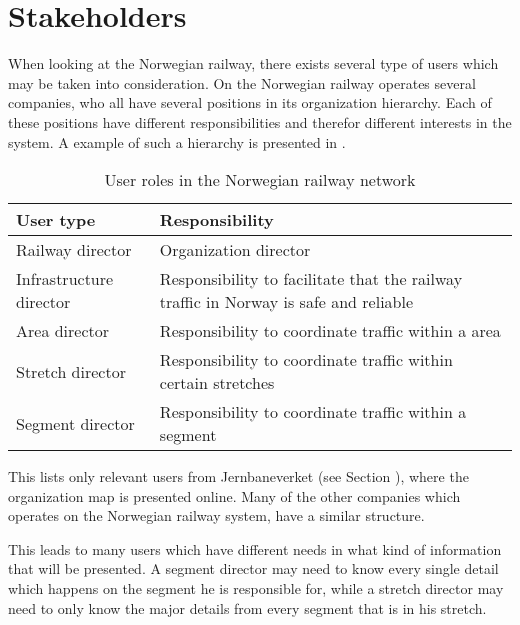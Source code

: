 \clearpage
\section{Stakeholders} %
\label{sec:back_stakeholders}
When looking at the Norwegian railway, there exists several type of users which
may be taken into consideration. On the Norwegian railway operates several
companies, who all have several positions in its organization hierarchy. Each
of these positions have different responsibilities and therefor different
interests in the system. A example of such a hierarchy is presented in
.

\begin{table}[!h]\small
	\begin{tabularx}{\textwidth}{|l|X|}
		\hline
		User type & Responsibility \\
		\hline
		Railway director & Organization director\\
		\hline
		Infrastructure director & Responsibility to facilitate that the railway traffic in Norway is safe and reliable\\
		\hline
		Area director & Responsibility to coordinate traffic within a area\\
		\hline
		Stretch director & Responsibility to coordinate traffic within certain
		stretches\\
		\hline
		Segment director & Responsibility to coordinate traffic within a segment\\
		\hline
	\end{tabularx}
\caption{User roles in the Norwegian railway network}
\label{table:user_roles}
\end{table}

This lists only relevant users from Jernbaneverket (see Section
), where the organization map is presented
online\cite{jernbaneverketOrganisasjon}\cite{jernbaneverketInfrastruktdivisjon}.
Many of the other companies which operates on the Norwegian railway system,
have a similar structure. 

This leads to many users which have different needs
in what kind of information that will be presented. A segment director may need
to know every single detail which happens on the segment he is responsible for,
while a stretch director may need to only know the major details from every
segment that is in his stretch. 


